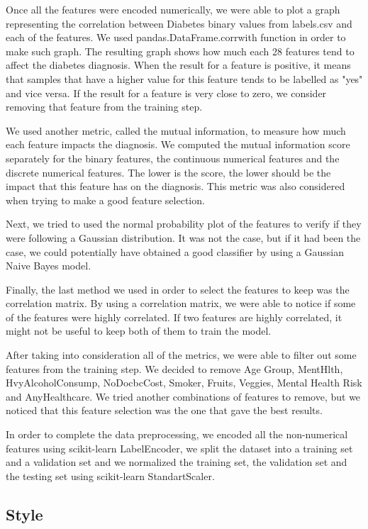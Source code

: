 \documentclass{article} %
\begin{document}
Once all the features were encoded numerically, we were able to plot a graph representing the correlation between Diabetes binary 
values from labels.csv and each of the features. We used pandas.DataFrame.corrwith function in order to make such graph. 
The resulting graph shows how much each 28 features tend to affect the diabetes diagnosis. When the result for a feature is positive, 
it means that samples that have a higher value for this feature tends to be labelled as "yes" and vice versa. If the result for a 
feature is very close to zero, we consider removing that feature from the training step. 

We used another metric, called the mutual information, to measure how much each feature impacts the diagnosis. We computed the mutual 
information score separately for the binary features, the continuous numerical features and the discrete numerical features. 
The lower is the score, the lower should be the impact that this feature has on the diagnosis. This metric was also considered when 
trying to make a good feature selection.

Next, we tried to used the normal probability plot of the features to verify if they were following a Gaussian distribution. It was not 
the case, but if it had been the case, we could potentially have obtained a good classifier by using a Gaussian Naive Bayes model.

Finally, the last method we used in order to select the features to keep was the correlation matrix. By using a correlation matrix, we 
were able to notice if some of the features were highly correlated. If two features are highly correlated, it might not be useful to 
keep both of them to train the model. 

After taking into consideration all of the metrics, we were able to filter out some features from the training step. We decided to 
remove Age Group, MentHlth, HvyAlcoholConsump, NoDocbcCost, Smoker, Fruits, Veggies, Mental Health Risk and AnyHealthcare. 
We tried another combinations of features to remove, but we noticed that this feature selection was the one that gave the best results.

In order to complete the data preprocessing, we encoded all the non-numerical features using scikit-learn LabelEncoder, we split the 
dataset into a training set and a validation set and we normalized the training set, the validation set and the testing set using 
scikit-learn StandartScaler. 

\subsection{Style}
\end{document}
